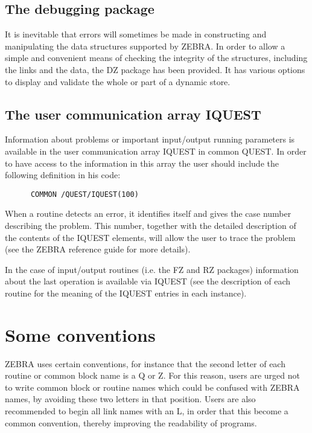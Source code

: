 \subsection{The debugging package}
\par
It is inevitable that errors will sometimes be made in constructing and
manipulating the data structures supported by ZEBRA. In order to allow
a simple and convenient means of checking the integrity of the structures,
including the links and the data, the DZ package has been provided.
It has various options to display and validate the whole or part of a dynamic
store.
\subsection{The user communication array IQUEST}
\par
Information about problems or important input/output running
parameters is available in the user communication array IQUEST in common
QUEST. In order to have access to the information
in this array
the user should include the following definition in his code:
\begin{verbatim}
      COMMON /QUEST/IQUEST(100)
\end{verbatim}
When a routine detects an error, it identifies itself and gives the
case number describing the problem. This number, together with the
detailed description of the contents of the IQUEST elements, will allow
the user to trace the problem (see the ZEBRA reference guide
for more details).
\par In the case of input/output routines (i.e. the FZ and RZ packages)
information about the last operation is available via IQUEST
(see the description of each routine for the meaning of the
IQUEST entries in each instance).
\section{Some conventions}
\par
ZEBRA uses certain conventions,
for instance that the second letter of each routine or common block
name is a Q or Z. For this reason, users are urged not to
write common block or routine names which could be confused with ZEBRA
names, by avoiding these two letters in that position. Users are also
recommended to begin all link names with an L, in order that this become
a common convention, thereby improving the readability of programs.
